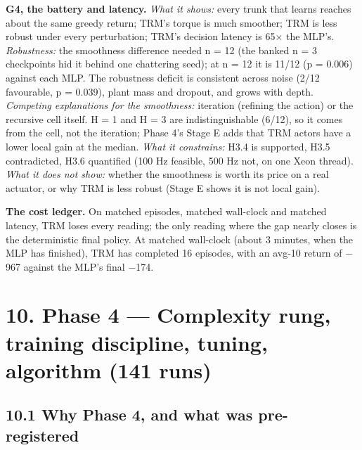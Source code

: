 \documentclass[11pt]{article}
\begin{document}
\textbf{G4, the battery and latency.} \emph{What it shows:} every trunk that learns reaches about the same greedy return; TRM's torque is much smoother; TRM is less robust under every perturbation; TRM's decision latency is 65$\times$ the MLP's. \emph{Robustness:} the smoothness difference needed n = 12 (the banked n = 3 checkpoints hid it behind one chattering seed); at n = 12 it is 11/12 (p = 0.006) against each MLP. The robustness deficit is consistent across noise (2/12 favourable, p = 0.039), plant mass and dropout, and grows with depth. \emph{Competing explanations for the smoothness:} iteration (refining the action) or the recursive cell itself. H = 1 and H = 3 are indistinguishable (6/12), so it comes from the cell, not the iteration; Phase 4's Stage E adds that TRM actors have a lower local gain at the median. \emph{What it constrains:} H3.4 is supported, H3.5 contradicted, H3.6 quantified (100 Hz feasible, 500 Hz not, on one Xeon thread). \emph{What it does not show:} whether the smoothness is worth its price on a real actuator, or why TRM is less robust (Stage E shows it is not local gain).



\textbf{The cost ledger.} On matched episodes, matched wall-clock and matched latency, TRM loses every reading; the only reading where the gap nearly closes is the deterministic final policy. At matched wall-clock (about 3 minutes, when the MLP has finished), TRM has completed 16 episodes, with an avg-10 return of $-$967 against the MLP's final $-$174.





\medskip



\section*{10. Phase 4 --- Complexity rung, training discipline, tuning, algorithm (141 runs)}



\subsection*{10.1 Why Phase 4, and what was pre-registered}
\end{document}
